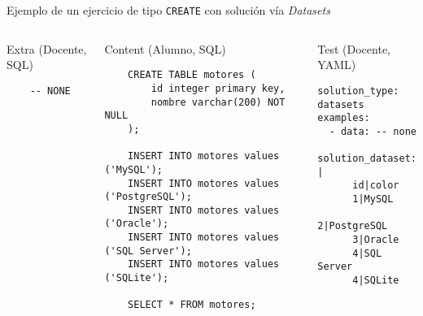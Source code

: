 Ejemplo de un ejercicio de tipo \texttt{CREATE} con solución vía \textit{Datasets}

\begin{columns}[t]
    \begin{listing}[H]
        \caption{Extra (Docente, SQL)}
        \begin{verbatim}
    -- NONE
        \end{verbatim}
    \end{listing}

    \begin{listing}[H]
        \caption{Content (Alumno, SQL)}
        \begin{verbatim}
    CREATE TABLE motores (
        id integer primary key,
        nombre varchar(200) NOT NULL
    );

    INSERT INTO motores values ('MySQL');
    INSERT INTO motores values ('PostgreSQL');
    INSERT INTO motores values ('Oracle');
    INSERT INTO motores values ('SQL Server');
    INSERT INTO motores values ('SQLite');

    SELECT * FROM motores;
        \end{verbatim}
    \end{listing}

    \begin{listing}[H]
        \caption{Test (Docente, YAML)}
        \begin{verbatim}
solution_type: datasets
examples:
  - data: -- none
    solution_dataset: |
      id|color
      1|MySQL
      2|PostgreSQL
      3|Oracle
      4|SQL Server
      4|SQLite
        \end{verbatim}
    \end{listing}

\end{columns}
